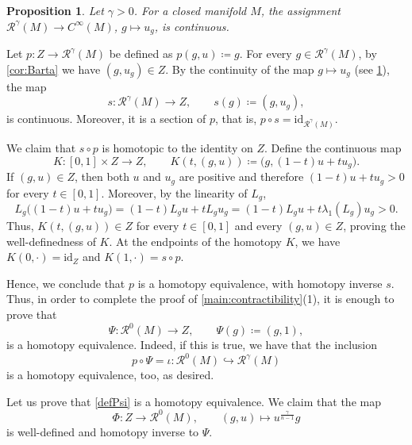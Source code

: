 \documentclass[11pt]{amsart}
\numberwithin{equation}{section}
\newtheorem{proposition}[theorem]{Proposition}
\newcommand{\Riem}{\mathcal{R}}
\begin{document}
\begin{proposition}\label{prop:first-eigenfunction-cts-dependence}
  Let $\gamma>0$. For a closed manifold $M$, the assignment $\Riem^\gamma(M)\to C^\infty(M)$, $g\mapsto u_g$, is continuous.
\end{proposition}

Let $p:Z\to \Riem^\gamma(M)$ be defined as $p(g,u)\coloneqq g$. For every $g\in\Riem^\gamma(M)$, by \cref{cor:Barta} we have $(g,u_g)\in Z$. By the continuity of the map $g\mapsto u_g$ (see \cref{prop:first-eigenfunction-cts-dependence}), the map
\[
    s:\Riem^\gamma(M)\longrightarrow Z,
    \qquad
    s(g)\coloneqq (g,u_g),
\]
is continuous. Moreover, it is a section of $p$, that is,
$p\circ s=\mathrm{id}_{\Riem^\gamma(M)}$.

We claim that $s\circ p$ is homotopic to the identity on $Z$. Define the continuous map
\begin{equation}\label{eqn:KHomotopy}
    K:[0,1]\times Z\longrightarrow Z,
    \qquad
    K(t,(g,u))
    \coloneqq 
    \bigl(g,(1-t)u+tu_g\bigr).
\end{equation}
If $(g,u)\in Z$, then
both $u$ and $u_g$ are positive and therefore $
    (1-t)u+tu_g>0$ for every $t\in [0,1]$.
Moreover, by the linearity of $L_g$,
\[
    L_g\bigl((1-t)u+tu_g\bigr)
    =(1-t)L_gu+tL_gu_g
    =(1-t)L_gu+t\lambda_1(L_g)u_g
    >0.
\]
Thus, $K(t,(g,u))\in Z$ for every $t\in[0,1]$ and every $(g,u)\in Z$, proving the well-definedness of $K$. At the endpoints of the homotopy $K$, we have $
    K(0,\cdot)=\mathrm{id}_Z$
and $
    K(1,\cdot)=s\circ p$.
    
Hence, we conclude that $p$ is a homotopy equivalence, with homotopy inverse $s$. Thus, in order to complete the proof of \cref{main:contractibility}(1), it is enough to prove that
\begin{equation}\label{defPsi}
    \Psi:\Riem^0(M)\longrightarrow Z,
    \qquad
    \Psi(g)\coloneqq (g,1),
\end{equation}
is a homotopy equivalence. Indeed, if this is true, we have that the inclusion 
$$p\circ\Psi=\iota:\Riem^0(M)\hookrightarrow\Riem^\gamma(M)$$
is a homotopy equivalence, too, as desired.

\medskip

Let us prove that \eqref{defPsi} is a homotopy equivalence.
We claim that the map
\[
 \Phi \colon Z \to \Riem^{0}(M), \qquad (g,u)\mapsto u^{\frac\gamma{n-1}}g
\]
is well-defined and homotopy inverse to $\Psi$.
\end{document}
